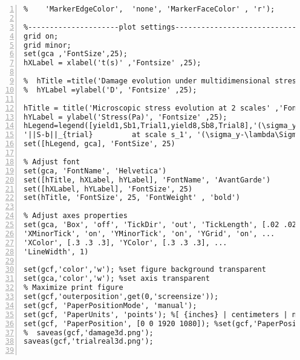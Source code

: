 \begin{lstlisting}[numbers=left, numberstyle=\tiny, keywordstyle=\color{blue!100}, commentstyle=\color{red!30!green!100!blue!100}, frame=shadowbox, rulesepcolor=\color{red!20!green!20!blue!20}]
% DamageN=plot ((1:n)*step,D(1:n),'LineStyle', 'none','LineWidth', 1, 'Marker', 'o', 'MarkerSize', 6, ...
%    'MarkerEdgeColor',  'none', 'MarkerFaceColor' , 'r');

%---------------------plot settings-----------------------------
grid on;
grid minor;
set(gca ,'FontSize',25);
hXLabel = xlabel('t(s)' ,'Fontsize' ,25);

%  hTitle =title('Damage evolution under multidimensional stress' ,'Fontsize' ,25);
%  hYLabel =ylabel('D', 'Fontsize' ,25);

hTitle = title('Microscopic stress evolution at 2 scales' ,'Fontsize' ,25);
hYLabel = ylabel('Stress(Pa)', 'Fontsize' ,25);
hLegend=legend([yield1,Sb1,Trial1,yield8,Sb8,Trial8],'(\sigma_y-\lambda\Sigma_H)/s_1     at scale s_1','||S-b||              at scale s_1',...
'||S-b||_{trial}         at scale s_1', '(\sigma_y-\lambda\Sigma_H)/s_8     at scale s_{8}','||S-b||              at scale s_{8}','||S-b||_{trial}         at scale s_{8}');
set([hLegend, gca], 'FontSize', 25)

% Adjust font
set(gca, 'FontName', 'Helvetica')
set([hTitle, hXLabel, hYLabel], 'FontName', 'AvantGarde')
set([hXLabel, hYLabel], 'FontSize', 25)
set(hTitle, 'FontSize', 25, 'FontWeight' , 'bold')

% Adjust axes properties
set(gca, 'Box', 'off', 'TickDir', 'out', 'TickLength', [.02 .02], ...
'XMinorTick', 'on', 'YMinorTick', 'on', 'YGrid', 'on', ...
'XColor', [.3 .3 .3], 'YColor', [.3 .3 .3], ...
'LineWidth', 1)

set(gcf,'color','w'); %set figure background transparent
set(gca,'color','w'); %set axis transparent
% Maximize print figure
set(gcf,'outerposition',get(0,'screensize'));
set(gcf, 'PaperPositionMode', 'manual');
set(gcf, 'PaperUnits', 'points'); %[ {inches} | centimeters | normalized | points ]
set(gcf, 'PaperPosition', [0 0 1920 1080]); %set(gcf,'PaperPosition',[left,bottom,width,height])
%  saveas(gcf,'damage3d.png');
saveas(gcf,'trialreal3d.png');


\end{lstlisting}

